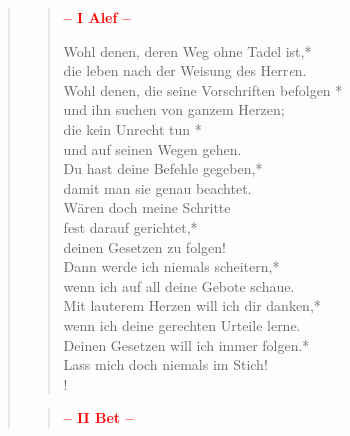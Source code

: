 


\begin{quote}
\begin{verse}
 
\begin{center}
 \textcolor{red}{\normalsize\bf – I Alef –}\\
\end{center} 

Wohl denen, deren Weg ohne Tadel ist,*\\
die leben nach der Weisung des Herr\textit{e}n.\\
\vin Wohl denen, die seine Vorschriften befolgen *\\
\vin und ihn suchen von ganzem Herzen;\\
die kein Unrecht tun *\\
und auf seinen Wegen gehen.\\
\vin Du hast deine Befehle gegeben,*\\
\vin damit man sie genau beachtet.\\
Wären doch meine Schritte\\
 fest darauf gerichtet,*\\
deinen Gesetzen zu folgen!\\
\vin Dann werde ich niemals scheitern,*\\
\vin wenn ich auf all deine Gebote schaue.\\
Mit lauterem Herzen will ich dir danken,*\\
wenn ich deine gerechten Urteile lerne.\\
\vin Deinen Gesetzen will ich immer folgen.*\\
\vin Lass mich doch niemals im Stich!\\!

\end{verse}

\begin{verse}

\begin{center}
 \textcolor{red}{\normalsize\bf – II Bet –}\\
\end{center}


\end{verse}
\end{quote}
